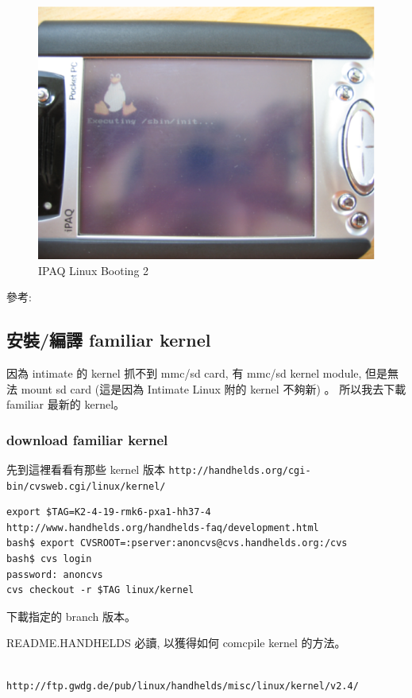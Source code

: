 \documentclass[12pt,a4paper]{article}
\begin{document}
\begin{CJK}{UTF8}{cwmu}
\begin{figure}[htbp]
\centering
\includegraphics[scale=0.5]{eps/booting_2.eps}
\caption{IPAQ Linux Booting 2}
\end{figure}

參考: \cite{intimate}

\subsection{安裝/編譯 familiar kernel}
因為 intimate 的 kernel 抓不到 mmc/sd card, 有 mmc/sd kernel module,
但是無法 mount sd card (這是因為 Intimate Linux 附的 kernel 不夠新) 。
所以我去下載 familiar 最新的 kernel。

\subsubsection{download familiar kernel}
先到這裡看看有那些 kernel 版本
\verb+http://handhelds.org/cgi-bin/cvsweb.cgi/linux/kernel/+

\begin{verbatim}
export $TAG=K2-4-19-rmk6-pxa1-hh37-4
http://www.handhelds.org/handhelds-faq/development.html
bash$ export CVSROOT=:pserver:anoncvs@cvs.handhelds.org:/cvs
bash$ cvs login
password: anoncvs
cvs checkout -r $TAG linux/kernel
\end{verbatim}
下載指定的 branch 版本。

README.HANDHELDS 必讀, 以獲得如何 comcpile kernel 的方法。


\begin{verbatim}

http://ftp.gwdg.de/pub/linux/handhelds/misc/linux/kernel/v2.4/


\end{verbatim}
\end{CJK}
\end{document}
